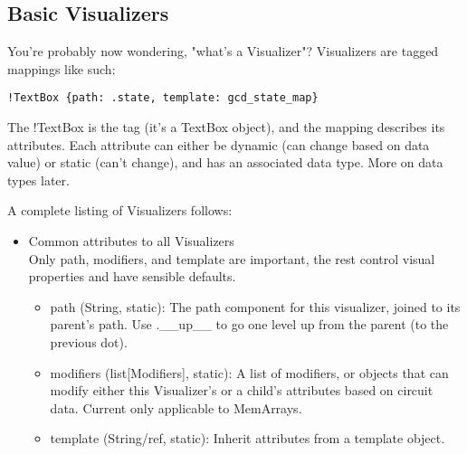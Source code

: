 \documentclass[11pt]{article}
\begin{document}
\subsection{Basic Visualizers}
You're probably now wondering, "what's a Visualizer"? Visualizers are tagged mappings like such:
\begin{verbatim}
!TextBox {path: .state, template: gcd_state_map}
\end{verbatim}
The !TextBox is the tag (it's a TextBox object), and the mapping describes its attributes. Each attribute can either be dynamic (can change based on data value) or static (can't change), and has an associated data type. More on data types later.

A complete listing of Visualizers follows:
\begin{itemize}
  \item Common attributes to all Visualizers \\
  Only path, modifiers, and template are important, the rest control visual properties and have sensible defaults.
  \begin{itemize}
    \item path (String, static): The path component for this visualizer, joined to its parent's path. Use .\_\_up\_\_ to go one level up from the parent (to the previous dot).
    \item modifiers (list[Modifiers], static): A list of modifiers, or objects that can modify either this Visualizer's or a child's attributes based on circuit data. Current only applicable to MemArrays.
    \item template (String/ref, static): Inherit attributes from a template object.
    

\end{itemize}
\end{itemize}
\end{document}
